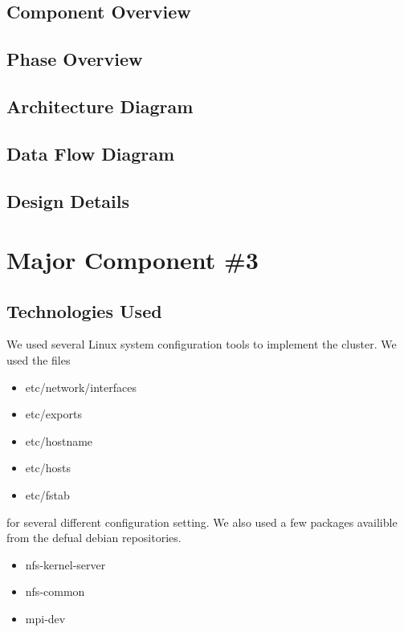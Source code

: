 \subsection{Component  Overview}

\subsection{Phase Overview}

\subsection{ Architecture  Diagram}


\subsection{Data Flow Diagram}


\subsection{Design Details}


\section{Major Component \#3 }

\subsection{Technologies  Used}
We used several Linux system configuration tools to implement the cluster. We used the files
\begin{itemize}
	\item etc/network/interfaces
	\item etc/exports
	\item etc/hostname
	\item etc/hosts
	\item etc/fstab
\end{itemize}
for several different configuration setting. We also used a few packages availible from the defual debian repositories.
\begin{itemize}
	\item nfs-kernel-server
	\item nfs-common
	\item mpi-dev
\end{itemize}

